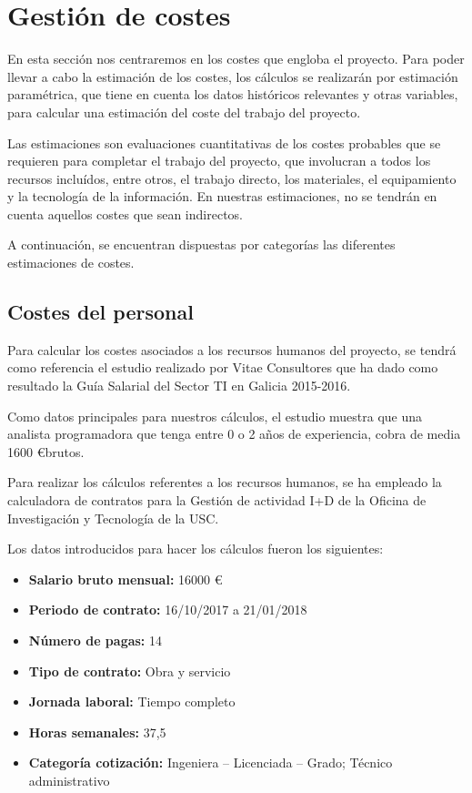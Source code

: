
\section{Gestión de costes}

En esta sección nos centraremos en los costes que engloba el proyecto. Para poder llevar a cabo la estimación de los costes, los cálculos se realizarán por estimación paramétrica\cite{pmbok}, que tiene en cuenta los datos históricos relevantes y otras variables, para calcular una estimación del coste del trabajo del proyecto.


Las estimaciones son evaluaciones cuantitativas de los costes probables que se requieren para completar el trabajo del proyecto, que involucran a todos los recursos incluídos, entre otros, el trabajo directo, los materiales, el equipamiento y la tecnología de la información. En nuestras estimaciones, no se tendrán en cuenta aquellos costes que sean indirectos.


A continuación, se encuentran dispuestas por categorías las diferentes estimaciones de costes.


\subsection{Costes del personal}
Para calcular los costes asociados a los recursos humanos del proyecto, se tendrá como referencia el estudio realizado por Vitae Consultores que ha dado como resultado la Guía Salarial del Sector TI en Galicia 2015-2016\cite{vitae}.


Como datos principales para nuestros cálculos, el estudio muestra que una analista programadora que tenga entre 0 o 2 años de experiencia, cobra de media 1600 \euro  brutos.


Para realizar los cálculos referentes a los recursos humanos, se ha empleado la calculadora de contratos para la Gestión de actividad I+D de la Oficina de Investigación y Tecnología de la USC\cite{calculadoracontratos}.


Los datos introducidos para hacer los cálculos fueron los siguientes:
\begin{itemize}
\item \textbf{Salario bruto mensual:} 16000 \euro
\item \textbf{Periodo de contrato:} 16/10/2017 a 21/01/2018
\item \textbf{Número de pagas:} 14
\item \textbf{Tipo de contrato:} Obra y servicio
\item \textbf{Jornada laboral:} Tiempo completo
\item \textbf{Horas semanales:} 37,5
\item \textbf{Categoría cotización:} Ingeniera – Licenciada – Grado; Técnico administrativo
\end{itemize}


